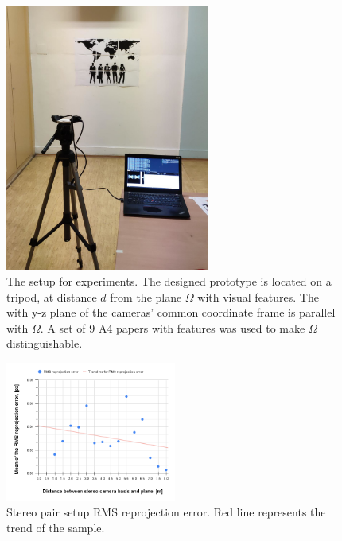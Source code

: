 \begin{figure}[ht]
    \centering
    \includegraphics[width=0.6\textwidth]{graphics/experiment_setup.png}
    \caption[The setup for experiments]{The setup for experiments. 
    The designed prototype is located on a tripod, at distance $d$ from the plane $\Omega$ with visual features.
    The with y-z plane of the cameras' common coordinate frame is parallel with $\Omega$. 
    A set of 9 A4 papers with features was used to make $\Omega$ distinguishable.}
    \label{fig:exp_process}
\end{figure}

\begin{figure}[ht]
  \centering
  \includegraphics[width=0.5\textwidth]{graphics/experiment_1_repro_error.png}
  \caption[Stereo setup RMS reprojection error.]{Stereo pair setup RMS reprojection error. Red line represents the trend of the sample.}
  \label{fig:exp_1_repro}
\end{figure}

